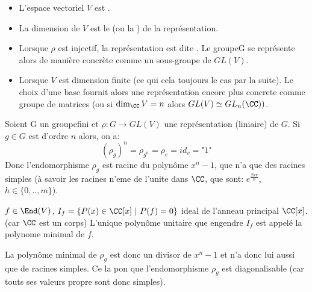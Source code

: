 \begin{definition}[Vocabulaire]	
	\leavevmode
	\begin{itemize}
		\item L'espace vectoriel $V$ est .
		\item La dimension de $V$ est le  (ou la ) de la représentation.
		\item Lorsque $\rho$ est injectif, la représentation est dite . Le groupeG se représente alors de manière concrète comme un sous-groupe de $GL(V)$.
		\item Lorsque $V$ est dimension finite (ce qui cela toujours le cas par la suite). Le choix d'une base fournit alors une représentation encore plus concrete comme groupe de matrices (ou si $\dim_\CC V=n$ alors $GL(V)\simeq GL_n(\CC))$.
	\end{itemize}	
\end{definition}


\begin{remark}
	Soient G un groupefini et $\rho:G\rightarrow GL(V)$ une représentation (liniaire) de $G$.
	Si $g\in G$ est d'ordre $n$ alors, on a:
	$$(\rho_g)^n=\rho_{g^n}=\rho_e=id_v=\text{"1"}$$
	Donc l'endomorphisme $\rho_g$ est racine du polynôme $x^n-1$, que n'a que des racines simples (à savoir les racines n'eme de l'unite dans $\CC$, que sont: $e^{\frac{2h\pi}{n}}$, $h\in\{0,..,m\}$).

	\begin{rappel}	
		$f\in \End (V)$, $I_f=\{P(x)\in\CC[x]\ |\ P(f)=0\}$ ideal de l'anneau principal $\CC[x]$. (car $\CC$ est un corps) L'unique polynôme unitaire que engendre $I_f$ est appelé la polynome minimal de $f$.
	\end{rappel}

	La polynôme minimal de $\rho_g$ est donc un divisor de $x^n-1$ et n'a donc lui aussi que de racines simples. Ce la pon que l'endomorphisme $\rho_g$ est diagonalisable (car touts ses valeurs propre sont donc simples).
\end{remark}

